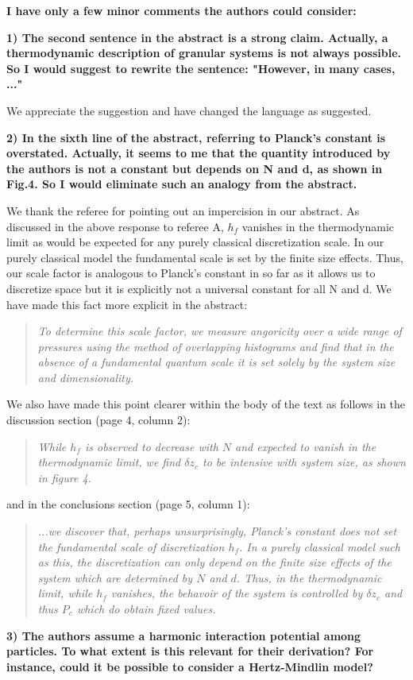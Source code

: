 \documentclass[a4paper,11pt]{article}
\begin{document}
\vskip 0.5cm
\textbf{I have only a few minor comments the authors could consider:}

\textbf{1) The second sentence in the abstract is a strong claim. Actually, a thermodynamic description of granular systems is not always possible. So I would suggest to rewrite the sentence: "However, in many cases,
..."}
\vskip 0.3cm

We appreciate the suggestion and have changed the language as suggested.

\vskip 0.5cm
\textbf{2) In the sixth line of the abstract, referring to Planck's constant is overstated. Actually, it seems to me that the quantity introduced by the authors is not a constant but depends on N and d, as shown in Fig.4. So I would eliminate such an analogy from the abstract.}
\vskip 0.3cm

We thank the referee for pointing out an impercision in our abstract. As discussed in the above response to referee A, $h_f$ vanishes in the thermodynamic limit as would be expected for any purely classical discretization scale. In our purely classical model the fundamental scale is set by the finite size effects.  Thus, our scale factor is analogous to Planck’s constant in so far as it allows us to discretize space but it is explicitly not a universal constant for all N and d.  We have made this fact more explicit in the abstract:

\begin{quote}
\textit{To determine this scale factor, we measure angoricity over a wide range of pressures using the method of overlapping histograms and find that in the absence of a fundamental quantum scale it is set solely by the system size and dimensionality.}
\end{quote}

We also have made this point clearer within the body of the text as follows in the discussion section (page 4, column 2):
\begin{quote}
\textit{While $h_f$ is observed to decrease with $N$ and expected to vanish in the thermodynamic limit, we find $\delta z_c$ to be intensive with system size, as shown in figure 4.}
\end{quote}
and in the conclusions section (page 5, column 1):
\begin{quote}
\textit{...we discover that, perhaps unsurprisingly, Planck's constant does not set the fundamental scale of discretization $h_f$. In a purely classical model such as this, the discretization can only depend on the finite size effects of the system which are determined by $N$ and $d$. Thus, in the thermodynamic limit, while $h_f$ vanishes, the behavoir of the system is controlled by $\delta z_c$ and thus $P_c$ which do obtain fixed values.}
\end{quote}
\vskip 0.5cm
\textbf{3) The authors assume a harmonic interaction potential among particles. To what extent is this relevant for their derivation? For instance, could it be possible to consider a Hertz-Mindlin model?}
\vskip 0.3cm
\end{document}
